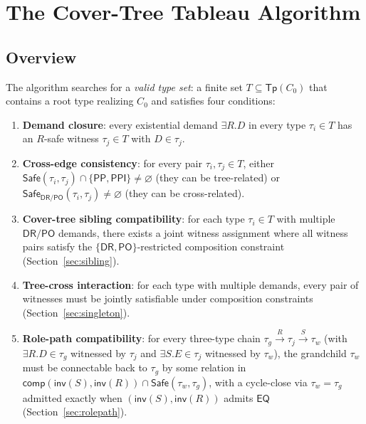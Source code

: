 \documentclass[a4paper,11pt]{article}
\theoremstyle{definition}
\newcommand{\DR}{\ensuremath{\mathsf{DR}}}
\newcommand{\PO}{\ensuremath{\mathsf{PO}}}
\newcommand{\EQ}{\ensuremath{\mathsf{EQ}}}
\newcommand{\PP}{\ensuremath{\mathsf{PP}}}
\newcommand{\PPI}{\ensuremath{\mathsf{PPI}}}
\newcommand{\inv}{\ensuremath{\mathsf{inv}}}
\newcommand{\comp}{\ensuremath{\mathsf{comp}}}
\newcommand{\Tp}{\ensuremath{\mathsf{Tp}}}
\newcommand{\Safe}{\ensuremath{\mathsf{Safe}}}
\begin{document}
\section{The Cover-Tree Tableau Algorithm}
\label{sec:algorithm}

\subsection{Overview}

The algorithm searches for a \emph{valid type set}: a finite set
$T \subseteq \Tp(C_0)$ that contains a root type realizing $C_0$
and satisfies four conditions:
\begin{enumerate}[label=(CT\arabic*)]
  \item \textbf{Demand closure}: every existential demand
    $\exists R.D$ in every type $\tau_i \in T$ has an $R$-safe
    witness $\tau_j \in T$ with $D \in \tau_j$.
  \item \textbf{Cross-edge consistency}: for every pair
    $\tau_i, \tau_j \in T$, either
    $\Safe(\tau_i,\tau_j) \cap \{\PP,\PPI\} \neq \varnothing$
    (they can be tree-related) or
    $\Safe_{\DR/\PO}(\tau_i,\tau_j) \neq \varnothing$
    (they can be cross-related).
  \item \textbf{Cover-tree sibling compatibility}: for each type
    $\tau_i \in T$ with multiple $\DR/\PO$ demands, there exists
    a joint witness assignment where all witness pairs satisfy the
    $\{\DR,\PO\}$-restricted composition constraint
    (Section~\ref{sec:sibling}).
  \item \textbf{Tree-cross interaction}: for each type with multiple
    demands, every pair of witnesses must be jointly satisfiable
    under composition constraints
    (Section~\ref{sec:singleton}).
  \item \textbf{Role-path compatibility}: for every three-type chain
    $\tau_g \xrightarrow{R} \tau_j \xrightarrow{S} \tau_w$ (with
    $\exists R.D \in \tau_g$ witnessed by $\tau_j$ and
    $\exists S.E \in \tau_j$ witnessed by $\tau_w$), the grandchild
    $\tau_w$ must be connectable back to $\tau_g$ by some relation
    in $\comp(\inv(S), \inv(R)) \cap \Safe(\tau_w, \tau_g)$, with a
    cycle-close via $\tau_w = \tau_g$ admitted exactly when
    $(\inv(S), \inv(R))$ admits $\EQ$ (Section~\ref{sec:rolepath}).
\end{enumerate}
\end{document}
